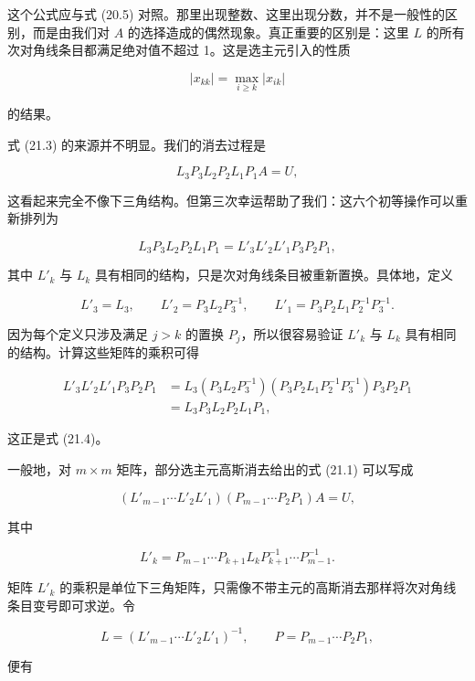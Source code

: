 \documentclass[UTF8,fontset=none,12pt]{ctexart}
\theoremstyle{definition}
\begin{document}
这个公式应与式 (20.5) 对照。那里出现整数、这里出现分数，并不是一般性的区别，而是由我们对 $A$ 的选择造成的偶然现象。真正重要的区别是：这里 $L$ 的所有次对角线条目都满足绝对值不超过 1。这是选主元引入的性质

$$
|x_{kk}|=\max_{i\ge k}|x_{ik}|
$$

的结果。

式 (21.3) 的来源并不明显。我们的消去过程是

\begin{equation}
L_3P_3L_2P_2L_1P_1A=U,
\tag{21.4a}
\end{equation}

这看起来完全不像下三角结构。但第三次幸运帮助了我们：这六个初等操作可以重新排列为

\begin{equation}
L_3P_3L_2P_2L_1P_1
=
L'_3L'_2L'_1P_3P_2P_1,
\tag{21.4}
\end{equation}

其中 $L'_k$ 与 $L_k$ 具有相同的结构，只是次对角线条目被重新置换。具体地，定义

$$
L'_3=L_3,\qquad
L'_2=P_3L_2P_3^{-1},\qquad
L'_1=P_3P_2L_1P_2^{-1}P_3^{-1}.
$$

因为每个定义只涉及满足 $j>k$ 的置换 $P_j$，所以很容易验证 $L'_k$ 与 $L_k$ 具有相同的结构。计算这些矩阵的乘积可得

$$
\begin{aligned}
L'_3L'_2L'_1P_3P_2P_1
&=L_3(P_3L_2P_3^{-1})
(P_3P_2L_1P_2^{-1}P_3^{-1})P_3P_2P_1\\
&=L_3P_3L_2P_2L_1P_1,
\end{aligned}
$$

这正是式 (21.4)。

一般地，对 $m\times m$ 矩阵，部分选主元高斯消去给出的式 (21.1) 可以写成

\begin{equation}
(L'_{m-1}\cdots L'_2L'_1)
(P_{m-1}\cdots P_2P_1)A=U,
\tag{21.5}
\end{equation}

其中

\begin{equation}
L'_k=P_{m-1}\cdots P_{k+1}L_kP_{k+1}^{-1}\cdots P_{m-1}^{-1}.
\tag{21.6}
\end{equation}

矩阵 $L'_k$ 的乘积是单位下三角矩阵，只需像不带主元的高斯消去那样将次对角线条目变号即可求逆。令

$$
L=(L'_{m-1}\cdots L'_2L'_1)^{-1},
\qquad
P=P_{m-1}\cdots P_2P_1,
$$

便有
\end{document}
